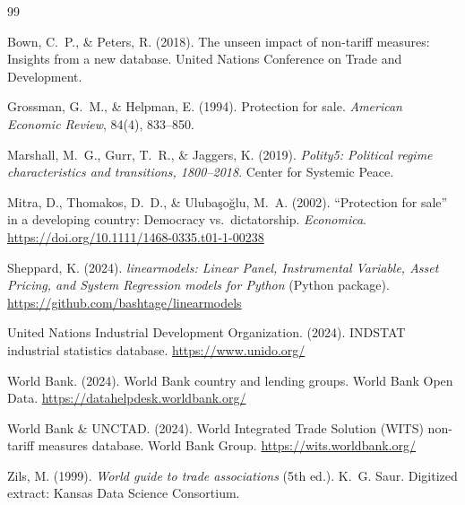 \documentclass[12pt,letterpaper]{article}
\begin{document}
\begin{thebibliography}{99}

Bown, C.~P., \& Peters, R. (2018).
\newblock The unseen impact of non-tariff measures: Insights from a new database.
\newblock United Nations Conference on Trade and Development.

Grossman, G.~M., \& Helpman, E. (1994).
\newblock Protection for sale.
\newblock \emph{American Economic Review}, 84(4), 833--850.

Marshall, M.~G., Gurr, T.~R., \& Jaggers, K. (2019).
\newblock \emph{Polity5: Political regime characteristics and transitions, 1800--2018}.
\newblock Center for Systemic Peace.

Mitra, D., Thomakos, D.~D., \& Uluba\c{s}o\u{g}lu, M.~A. (2002).
\newblock ``Protection for sale'' in a developing country: Democracy vs.\ dictatorship.
\newblock \emph{Economica}.
\newblock \url{https://doi.org/10.1111/1468-0335.t01-1-00238}

Sheppard, K. (2024).
\newblock \emph{linearmodels: Linear Panel, Instrumental Variable, Asset Pricing, and System Regression models for Python} (Python package).
\newblock \url{https://github.com/bashtage/linearmodels}

United Nations Industrial Development Organization. (2024).
\newblock INDSTAT industrial statistics database.
\newblock \url{https://www.unido.org/}

World Bank. (2024).
\newblock World Bank country and lending groups.
\newblock World Bank Open Data.
\newblock \url{https://datahelpdesk.worldbank.org/}

World Bank \& UNCTAD. (2024).
\newblock World Integrated Trade Solution (WITS) non-tariff measures database.
\newblock World Bank Group.
\newblock \url{https://wits.worldbank.org/}

Zils, M. (1999).
\newblock \emph{World guide to trade associations} (5th ed.).
\newblock K.~G. Saur. Digitized extract: Kansas Data Science Consortium.

\end{thebibliography}
\end{document}
